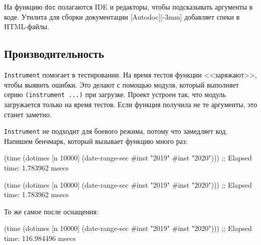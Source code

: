 \fi


На функцию \verb|doc| полагаются IDE и редакторы, чтобы подсказывать аргументы
в коде. Утилита для сборки документации [Autodoc][-3mm]
добавляет спеки в HTML-файлы.

\subsection{Производительность}


\verb|Instrument| помогает в тестировании. На время тестов функции
<<заряжают>>, чтобы выявить ошибки. Это делают с помощью модуля, который
выполняет серию \verb|(instrument ...)| при загрузке. Проект устроен так, что
модуль загружается только на время тестов. Если функция получила не те
аргументы, это станет заметно.


\verb|Instrument| не подходит для боевого режима, потому что замедляет
код. Напишем бенчмарк, который вызывает функцию много раз:


\ifx\DEVICETYPE\MOBILE

\begin{english}
  \begin{clojure}
(time
 (dotimes [n 10000]
   (date-range-sec #inst "2019"
                   #inst "2020")))
;; Elapsed time: 1.783962 msecs
  \end{clojure}
\end{english}

\else

\begin{english}
  \begin{clojure}
(time
 (dotimes [n 10000]
   (date-range-sec #inst "2019" #inst "2020")))
;; Elapsed time: 1.783962 msecs
  \end{clojure}
\end{english}

\fi

\noindent
То же самое после оснащения:

\ifx\DEVICETYPE\MOBILE

\begin{english}
  \begin{clojure}
(time
 (dotimes [n 10000]
   (date-range-sec #inst "2019"
                   #inst "2020")))
;; Elapsed time: 116.984496 msecs
  \end{clojure}
\end{english}

